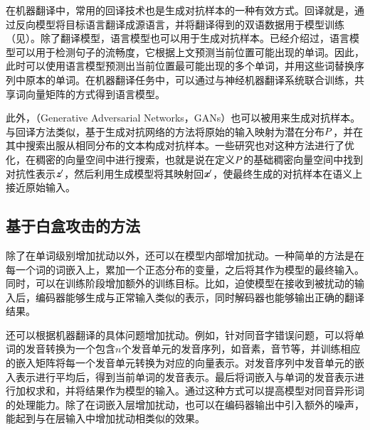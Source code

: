 \parinterval 在机器翻译中，常用的回译技术也是生成对抗样本的一种有效方式。回译就是，通过反向模型将目标语言翻译成源语言，并将翻译得到的双语数据用于模型训练（见{\chaptersixteen}）。除了翻译模型，语言模型也可以用于生成对抗样本。{\chaptertwo}已经介绍过，语言模型可以用于检测句子的流畅度，它根据上文预测当前位置可能出现的单词。因此，此时可以使用语言模型预测出当前位置最可能出现的多个单词，并用这些词替换序列中原本的单词。在机器翻译任务中，可以通过与神经机器翻译系统联合训练，共享词向量矩阵的方式得到语言模型。

\parinterval 此外，{\small{}}（Generative Adversarial Networks，GANs）也可以被用来生成对抗样本。与回译方法类似，基于生成对抗网络的方法将原始的输入映射为潜在分布${P}$，并在其中搜索出服从相同分布的文本构成对抗样本。一些研究也对这种方法进行了优化，在稠密的向量空间中进行搜索，也就是说在定义${P}$的基础稠密向量空间中找到对抗性表示$\textbf{\em z}'$，然后利用生成模型将其映射回$\textbf{\em x}'$，使最终生成的对抗样本在语义上接近原始输入。


\subsection{基于白盒攻击的方法}

\parinterval 除了在单词级别增加扰动以外，还可以在模型内部增加扰动。一种简单的方法是在每一个词的词嵌入上，累加一个正态分布的变量，之后将其作为模型的最终输入。同时，可以在训练阶段增加额外的训练目标。比如，迫使模型在接收到被扰动的输入后，编码器能够生成与正常输入类似的表示，同时解码器也能够输出正确的翻译结果。

\parinterval 还可以根据机器翻译的具体问题增加扰动。例如，针对同音字错误问题，可以将单词的发音转换为一个包含$n$个发音单元的发音序列，如音素，音节等，并训练相应的嵌入矩阵将每一个发音单元转换为对应的向量表示。对发音序列中发音单元的嵌入表示进行平均后，得到当前单词的发音表示。最后将词嵌入与单词的发音表示进行加权求和，并将结果作为模型的输入。通过这种方式可以提高模型对同音异形词的处理能力。除了在词嵌入层增加扰动，也可以在编码器输出中引入额外的噪声，能起到与在层输入中增加扰动相类似的效果。

